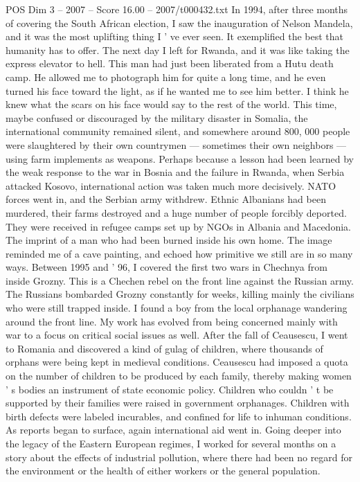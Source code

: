 \begin{textsample}{POS Dim 3 – 2007 – Score 16.00 – 2007/t000432.txt}
In 1994, after three months of covering the South African election, I saw the inauguration of Nelson Mandela, and it was the most uplifting thing I ' ve ever seen.
It exemplified the best that humanity has to offer.
The next day I left for Rwanda, and it was like taking the express elevator to hell.
This man had just been liberated from a Hutu death camp.
He allowed me to photograph him for quite a long time, and he even turned his face toward the light, as if he wanted me to see him better.
I think he knew what the scars on his face would say to the rest of the world.
This time, maybe confused or discouraged by the military disaster in Somalia, the international community remained silent, and somewhere around 800, 000 people were slaughtered by their own countrymen — sometimes their own neighbors — using farm implements as weapons.
Perhaps because a lesson had been learned by the weak response to the war in Bosnia and the failure in Rwanda, when Serbia attacked Kosovo, international action was taken much more decisively.
NATO forces went in, and the Serbian army withdrew.
Ethnic Albanians had been murdered, their farms destroyed and a huge number of people forcibly deported.
They were received in refugee camps set up by NGOs in Albania and Macedonia.
The imprint of a man who had been burned inside his own home.
The image reminded me of a cave painting, and echoed how primitive we still are in so many ways.
Between 1995 and ' 96, I covered the first two wars in Chechnya from inside Grozny.
This is a Chechen rebel on the front line against the Russian army.
The Russians bombarded Grozny constantly for weeks, killing mainly the civilians who were still trapped inside.
I found a boy from the local orphanage wandering around the front line.
My work has evolved from being concerned mainly with war to a focus on critical social issues as well.
After the fall of Ceausescu, I went to Romania and discovered a kind of gulag of children, where thousands of orphans were being kept in medieval conditions.
Ceausescu had imposed a quota on the number of children to be produced by each family, thereby making women ' s bodies an instrument of state economic policy.
Children who couldn ' t be supported by their families were raised in government orphanages.
Children with birth defects were labeled incurables, and confined for life to inhuman conditions.
As reports began to surface, again international aid went in.
Going deeper into the legacy of the Eastern European regimes, I worked for several months on a story about the effects of industrial pollution, where there had been no regard for the environment or the health of either workers or the general population.

\end{textsample}
